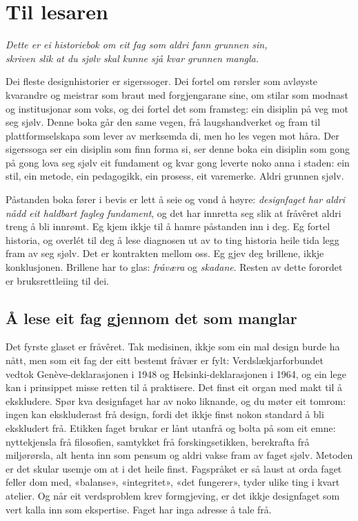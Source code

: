 \chapter*{Til lesaren}

\begin{center}\itshape
Dette er ei historiebok om eit fag som aldri fann grunnen sin,\\ skriven slik at du sjølv skal kunne sjå kvar grunnen mangla.
\end{center}
\vspace{8mm}

Dei fleste designhistorier er sigerssoger. Dei fortel om rørsler som avløyste kvarandre og meistrar som braut med forgjengarane sine, om stilar som modnast og institusjonar som voks, og dei fortel det som framsteg: ein disiplin på veg mot seg sjølv. Denne boka går den same vegen, frå laugshandverket og fram til plattformselskapa som lever av merksemda di, men ho les vegen mot håra. Der sigerssoga ser ein disiplin som finn forma si, ser denne boka ein disiplin som gong på gong lova seg sjølv eit fundament og kvar gong leverte noko anna i staden: ein stil, ein metode, ein pedagogikk, ein prosess, eit varemerke. Aldri grunnen sjølv.

Påstanden boka fører i bevis er lett å seie og vond å høyre: \emph{designfaget har aldri nådd eit haldbart fagleg fundament}, og det har innretta seg slik at fråvêret aldri treng å bli innrømt. Eg kjem ikkje til å hamre påstanden inn i deg. Eg fortel historia, og overlét til deg å lese diagnosen ut av to ting historia heile tida legg fram av seg sjølv. Det er kontrakten mellom oss. Eg gjev deg brillene, ikkje konklusjonen. Brillene har to glas: \emph{fråværa} og \emph{skadane}. Resten av dette forordet er bruksrettleiing til dei.

\section{Å lese eit fag gjennom det som manglar}

Det fyrste glaset er fråvêret. Tak medisinen, ikkje som ein mal design burde ha nått, men som eit fag der eitt bestemt fråvær er fylt: Verdslækjarforbundet vedtok Genève-deklarasjonen i 1948 og Helsinki-deklarasjonen i 1964, og ein lege kan i prinsippet misse retten til å praktisere. Det finst eit organ med makt til å ekskludere. Spør kva designfaget har av noko liknande, og du møter eit tomrom: ingen kan ekskluderast frå design, fordi det ikkje finst nokon standard å bli ekskludert frå. Etikken faget brukar er lånt utanfrå og bolta på som eit emne: nyttekjensla frå filosofien, samtykket frå forskingsetikken, berekrafta frå miljørørsla, alt henta inn som pensum og aldri vakse fram av faget sjølv. Metoden er det skular usemje om at i det heile finst. Fagspråket er så laust at orda faget feller dom med, «balanse», «integritet», «det fungerer», tyder ulike ting i kvart atelier. Og når eit verdsproblem krev formgjeving, er det ikkje designfaget som vert kalla inn som ekspertise. Faget har inga adresse å tale frå.

